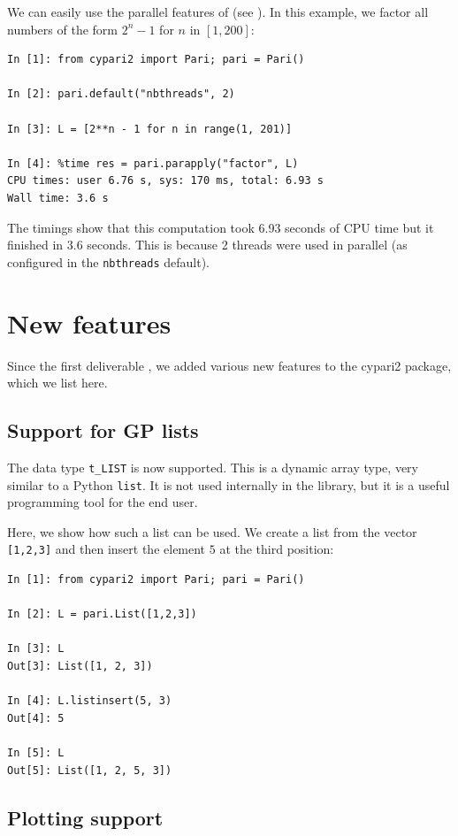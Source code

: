 \documentclass{deliverablereport}
\begin{document}
We can easily use the parallel features of \PariGP (see ).
In this example, we factor all numbers of the form $2^n - 1$ for $n$ in $[1, 200]$:
\begin{verbatim}
In [1]: from cypari2 import Pari; pari = Pari()

In [2]: pari.default("nbthreads", 2)

In [3]: L = [2**n - 1 for n in range(1, 201)]

In [4]: %time res = pari.parapply("factor", L)
CPU times: user 6.76 s, sys: 170 ms, total: 6.93 s
Wall time: 3.6 s
\end{verbatim}

The timings show that this computation took 6.93 seconds of CPU time
but it finished in 3.6 seconds.
This is because 2 threads were used in parallel
(as configured in the \texttt{nbthreads} default).

\section{New features}

Since the first deliverable ,
we added various new features to the cypari2 package,
which we list here.

\subsection{Support for GP lists}

The \PariGP data type \verb/t_LIST/ is now supported.
This is a dynamic array type, very similar to a Python \verb/list/.
It is not used internally in the \Pari library,
but it is a useful programming tool for the end user.

Here, we show how such a list can be used.
We create a list from the vector \verb/[1,2,3]/ and then insert the
element $5$ at the third position:
\begin{verbatim}
In [1]: from cypari2 import Pari; pari = Pari()

In [2]: L = pari.List([1,2,3])

In [3]: L
Out[3]: List([1, 2, 3])

In [4]: L.listinsert(5, 3)
Out[4]: 5

In [5]: L
Out[5]: List([1, 2, 5, 3])
\end{verbatim}

\subsection{Plotting support}
\end{document}
